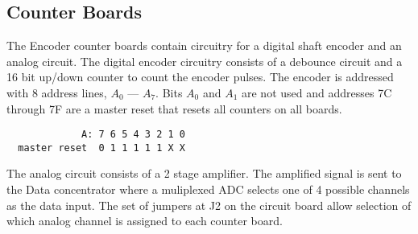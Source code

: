 
\clearpage
\newpage
\subsection{Counter Boards}
  
  The Encoder counter boards contain circuitry for a digital shaft encoder
and an analog circuit.  The digital encoder circuitry consists of a debounce
circuit and a 16 bit up/down counter to count the encoder pulses.  The
encoder is addressed with 8 address lines, 
$A_0$ --- $A_7$.  Bits $A_0$ and $A_1$
are not used and addresses 7C through 7F are a master reset that resets
all counters on all boards.
\begin{verbatim}
             A: 7 6 5 4 3 2 1 0
  master reset  0 1 1 1 1 1 X X
\end{verbatim}
  
    The analog circuit consists of a 2 stage amplifier.  The amplified
signal is sent to the Data concentrator where a muliplexed ADC selects
one of 4 possible channels as the data input.  The set of jumpers at J2
on the circuit board allow selection of which analog channel is assigned
to each counter board.

